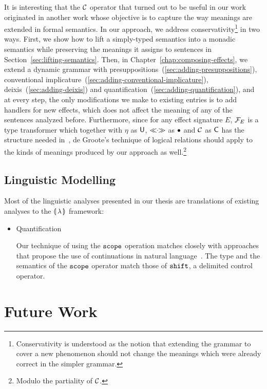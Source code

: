 It is interesting that the $\mathcal{C}$ operator that turned out to be useful in
our work originated in another work whose objective is to capture the way
meanings are extended in formal semantics. In our approach, we address
conservativity\footnote{Conservativity is understood as the notion that
  extending the grammar to cover a new phenomenon should not change the
  meanings which were already correct in the simpler grammar.} in two
ways. First, we show how to lift a simply-typed semantics into a monadic
semantics while preserving the meanings it assigns to sentences in
Section~\ref{sec:lifting-semantics}. Then, in
Chapter~\ref{chap:composing-effects}, we extend a dynamic grammar with
presuppositions~(\ref{sec:adding-presuppositions}), conventional
implicature~(\ref{sec:adding-conventional-implicature}),
deixis~(\ref{sec:adding-deixis}) and
quantification~(\ref{sec:adding-quantification}), and at every step, the
only modifications we make to existing entries is to add handlers for new
effects, which does not affect the meaning of any of the sentences analyzed
before. Furthermore, since for any effect signature $E$, $\mathcal{F}_E$ is a type
transformer which together with $\eta$ as $\textsf{U}$, $\mathbin{\ll\!\!\cdot\!\!\gg}$ as $\mathbin{\bullet}$ and
$\mathcal{C}$ as $\textsf{C}$ has the structure needed
in~\cite{degroote2015conservativity}, de Groote's technique of logical
relations should apply to the kinds of meanings produced by our approach as
well.\footnote{Modulo the partiality of $\mathcal{C}$.}


\subsection{Linguistic Modelling}

Most of the linguistic analyses presented in our thesis are translations of
existing analyses to the ${\llparenthesis \, \lambda \, \rrparenthesis}$ framework:

\begin{itemize}
\item Quantification 

  Our technique of using the $\mathtt{scope}$ operation matches closely with
  approaches that propose the use of continuations in natural
  language~\cite{de2001type,barker2002continuations,shan2005linguistic}. The
  type and the semantics of the $\mathtt{scope}$ operator match those of
  $\mathtt{shift}$, a delimited control operator. 
\end{itemize}


\section{Future Work}
